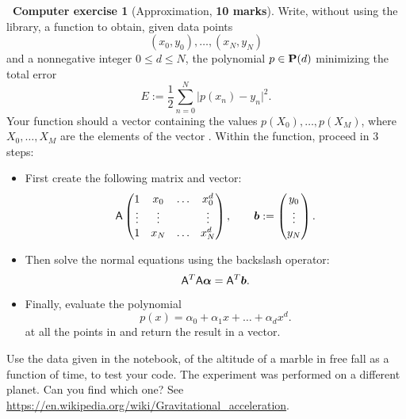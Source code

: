 \documentclass[11pt]{article}
\theoremstyle{definition}
\newtheorem{compexercise}{{\normalfont \faLaptop}~Computer exercise}
\renewcommand{\mymarks}[1]{\textbf{#1 marks}}
\begin{document}
\newpage
\begin{compexercise}
    [Approximation, \mymarks{10}]
    Write, without using the  library,
    a function  to obtain,
    given data points
    \[
        (x_0, y_0), \dotsc, (x_N, y_N)
    \]
    and a nonnegative integer $0 \leq d \leq N$,
    the polynomial $p \in \mathbf P(d)$ minimizing the total error
    \[
        E := \frac{1}{2} \sum_{n=0}^{N} \bigl\lvert p(x_n) - y_n \bigr\rvert^2.
    \]
    Your function should a vector containing the values $p(X_0), \dotsc, p(X_M)$,
    where $X_0, \dotsc, X_M$ are the elements of the vector .
    Within the function, proceed in 3 steps:
    \begin{itemize}
        \item
            First create the following matrix and vector:
            \[
                \mathsf A
                \begin{pmatrix}
                    1 & x_0 & \hdots & x_0^d \\
                    \vdots & \vdots & & \vdots \\
                    1 & x_{N} & \hdots & x_N^d
                \end{pmatrix},
                \qquad
                \mathbf{\boldsymbol{b}} :=
                \begin{pmatrix}
                    y_0 \\
                    \vdots \\
                    y_N
                \end{pmatrix}.
            \]
            \item
                Then solve the normal equations using the backslash operator:
                \[
                    \mathsf A^T \mathsf A \mathbf{\boldsymbol{\alpha}} = \mathsf A^T \mathbf{\boldsymbol{b}}.
                \]

            \item
                Finally, evaluate the polynomial
                \[
                    p(x) = \alpha_0 + \alpha_1 x + \dotsc + \alpha_d x^d.
                \]
                at all the points in  and return the result in a vector.
    \end{itemize}
    Use the data given in the notebook,
    of the altitude of a marble in free fall as a function of time,
    to test your code.
    The experiment was performed on a different planet.
    Can you find which one?
    See \url{https://en.wikipedia.org/wiki/Gravitational_acceleration}.
\end{compexercise}
\end{document}
